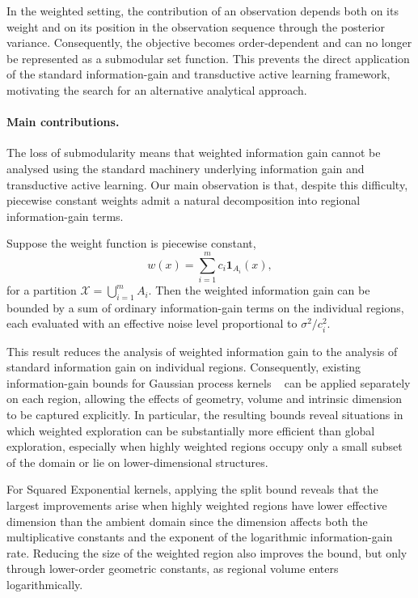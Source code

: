 In the weighted setting, the contribution of an observation depends both on its weight and on its position in the observation sequence through the posterior variance. Consequently, the objective becomes order-dependent and can no longer be represented as a submodular set function. This prevents the direct application of the standard information-gain and transductive active learning framework, motivating the search for an alternative analytical approach.

\paragraph{Main contributions.}

The loss of submodularity means that weighted information gain cannot be analysed using the standard machinery underlying information gain and transductive active learning. Our main observation is that, despite this difficulty, piecewise constant weights admit a natural decomposition into regional information-gain terms.

\begin{proposition*}
Suppose the weight function is piecewise constant,
$$
w(x)
=
\sum_{i=1}^m
c_i \mathbf 1_{A_i}(x),
$$
for a partition
$
\mathcal X
=
\bigcup_{i=1}^m A_i.
$
Then the weighted information gain can be bounded by a sum of ordinary information-gain terms on the individual regions, each evaluated with an effective noise level proportional to $\sigma^2/c_i^2$.
\end{proposition*}

This result reduces the analysis of weighted information gain to the
analysis of standard information gain on individual regions. Consequently,
existing information-gain bounds for Gaussian process kernels
~\cite{Seeger2008,Srinivas2009}
can be applied separately on each region, allowing the effects of geometry,
volume and intrinsic dimension to be captured explicitly. In particular, the resulting bounds reveal situations in which weighted exploration can be substantially more efficient than global exploration, especially when highly weighted regions occupy only a small subset of the domain or lie on lower-dimensional structures.

\begin{proposition*}
For Squared Exponential kernels, applying the split bound reveals that the
largest improvements arise when highly weighted regions have lower effective dimension than the ambient domain since the dimension affects both the multiplicative constants and the exponent of the logarithmic information-gain rate. Reducing the size of the weighted region also improves the bound, but only through lower-order geometric constants, as regional volume enters
logarithmically.
\end{proposition*}

